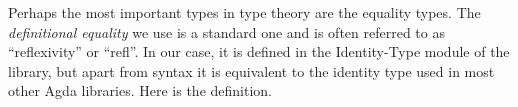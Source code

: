 Perhaps the most important types in type theory are the equality types. The \emph{definitional equality} we use is a standard one and is often referred to as ``reflexivity'' or ``refl''.  In our case, it is defined in the Identity-Type module of the \TypeTopology library, but apart from syntax it is equivalent to the identity type used in most other Agda libraries. Here is the definition.
\ccpad
\begin{code}%
\>[0]\AgdaSpace{}%
\AgdaSpace{}%
\AgdaSymbol{\{}\AgdaSymbol{\}}\AgdaSpace{}%
\AgdaSymbol{\{}\AgdaSpace{}%
\AgdaSymbol{:}\AgdaSpace{}%
\AgdaSpace{}%
\AgdaSpace{}%
\AgdaSymbol{\}}\AgdaSpace{}%
\AgdaSymbol{:}\AgdaSpace{}%
\AgdaSpace{}%
\AgdaSpace{}%
\AgdaSpace{}%
\AgdaSpace{}%
\AgdaSpace{}%
\AgdaSpace{}%
\<%
\\
\>[0][@{}l@{\AgdaIndent{0}}]%
\>[2]\AgdaSpace{}%
\AgdaSymbol{:}\AgdaSpace{}%
\AgdaSymbol{\{}\AgdaSpace{}%
\AgdaSymbol{:}\AgdaSpace{}%
\AgdaSymbol{\}}\AgdaSpace{}%
\AgdaSpace{}%
\AgdaSpace{}%
\AgdaSpace{}%
\<%
\end{code}
\ccpad
